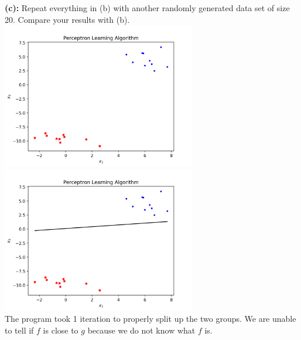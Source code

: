 \documentclass[a4paper]{article}
\begin{document}
\indent \textbf{(c):} Repeat everything in (b) with another randomly
generated data set of size 20. Compare your results with (b). \\
\includegraphics[width=85mm]{c_1.png} 
\includegraphics[width=85mm]{c_2.png} \\
The program took 1 iteration to properly split up the two groups.
We are unable to tell if $f$ is close to $g$ because we do not know 
what $f$ is. \\ 
\end{document}
